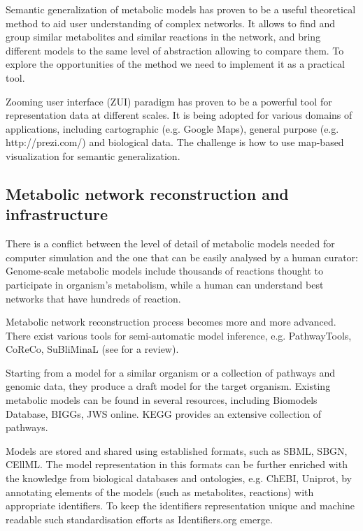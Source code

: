 \documentclass{bmcart}
\begin{document}
Semantic generalization of metabolic models\cite{Zhukova2014} has proven to be a useful theoretical method to aid user understanding of complex networks. It allows to find and group similar metabolites and similar reactions in the network, and bring different models to the same level of abstraction allowing to compare them. 
To explore the opportunities of the method we need to implement it as a practical tool.

Zooming user interface (ZUI)\cite{Bederson1998} paradigm has proven to be a powerful tool for representation data at different scales. It is being adopted for various domains of applications, including cartographic (e.g. Google Maps), general purpose (e.g. http://prezi.com/) and biological data. The challenge is how to use map-based visualization for semantic generalization.

\subsection*{Metabolic network reconstruction and infrastructure}
There is a conflict between the level of detail of metabolic models needed for computer simulation and the one that can be easily analysed by a human curator: Genome-scale metabolic models include thousands of reactions thought to participate in organism's metabolism, while a human can understand best networks that have hundreds of reaction.

Metabolic network reconstruction process becomes more and more advanced. There exist various tools for semi-automatic model inference, e.g. PathwayTools\cite{Karp2002}, CoReCo\cite{Pitkanen2014}, SuBliMinaL\cite{Swainston2011} (see \cite{Hamilton2014} for a review).

Starting from a model for a similar organism or a collection of pathways and genomic data, they produce a draft model for the target organism. Existing metabolic models can be found in several resources, including Biomodels Database\cite{Li10}, BIGGs\cite{Schellenberger2010}, JWS online\cite{Snoep2003}. KEGG\cite{Kanehisa12} provides an extensive collection of pathways. 

Models are stored and shared using established formats, such as SBML\cite{Hucka2003}, SBGN\cite{Moodie2011}, CEllML\cite{Lloyd2004}. The model representation in this formats can be further enriched with the knowledge from biological databases and ontologies, e.g. ChEBI\cite{deMatos10}, Uniprot\cite{TheUniProtConsortium2013}, by annotating elements of the models (such as metabolites, reactions) with appropriate identifiers. To keep the identifiers representation unique and machine readable such standardisation efforts as Identifiers.org\cite{Juty2012} emerge.
\end{document}
